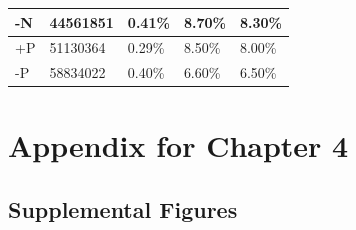 \begin{table}[h!]
\begin{tabular}{|C{2cm}|C{2.5cm}|C{2.5cm}|C{2.5cm}|C{2.5cm}|}
-N                      & 44561851                                                     & 0.41\%             & 8.70\%         & 8.30\%          \\ \hline
+P                      & 51130364                                                     & 0.29\%             & 8.50\%         & 8.00\%          \\ \hline
-P                      & 58834022                                                     & 0.40\%             & 6.60\%         & 6.50\%          \\ \hline
\end{tabular}
\end{table}






\section{Appendix for Chapter 4}
\subsection{Supplemental Figures}

